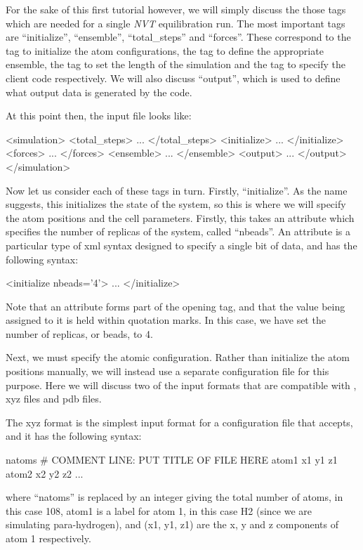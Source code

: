 \documentclass[11pt,english,fleqn]{report}
\newenvironment{code}{%
\footnotesize 
\verbatim
}{
\endverbatim
\normalsize
}
\begin{document}
For the sake of this first tutorial however, we will simply discuss the
those tags which are needed for a single \emph{NVT} equilibration run.
The most important tags are {}``initialize'', {}``ensemble'', 
{}``total\_steps'' and {}``forces''.
These correspond to the tag to initialize the atom configurations,
the tag to define the appropriate ensemble,
the tag to set the length of the simulation and the tag to specify the client code
respectively.
We will also discuss {}``output'', which is used to define what output data
is generated by the code.

At this point then, the input file looks like:

\begin{code}
<simulation>
   <total_steps>
      ...
   </total_steps>
   <initialize>
      ...
   </initialize>
   <forces>
      ...
   </forces>
   <ensemble>
      ...
   </ensemble>
   <output>
      ...
   </output>
</simulation>
\end{code}

Now let us consider each of these tags in turn. Firstly, {}``initialize''.
As the name suggests, this initializes the state of the system, so
this is where we will specify the atom positions and the cell
parameters. Firstly, this takes an attribute which specifies the number
of replicas of the system, called {}``nbeads''. An attribute is
a particular type of xml syntax designed to specify a single bit of
data, and has the following syntax:

\begin{code}
<initialize nbeads='4'>
   ...
</initialize>
\end{code}

Note that an attribute forms part of the opening tag, and that the
value being assigned to it is held within quotation marks. In this
case, we have set the number of replicas, or beads, to 4.

Next, we must specify the atomic configuration. Rather than initialize
the atom positions manually, we will instead use a separate configuration 
file for this purpose.
Here we will discuss two of the input formats that are compatible
with \ipi, xyz files and pdb files.

The xyz format is the simplest input format
for a configuration file that \ipi accepts, and it has the following
syntax:

\begin{code}
natoms
# COMMENT LINE: PUT TITLE OF FILE HERE
atom1   x1  y1  z1
atom2   x2  y2  z2
...
\end{code}
where {}``natoms'' is replaced by an integer giving the total number
of atoms, in this case 108, atom1 is a label for atom 1, in this case
H2 (since we are simulating para-hydrogen), and (x1, y1, z1) are the
x, y and z components of atom 1 respectively. 
\end{document}
